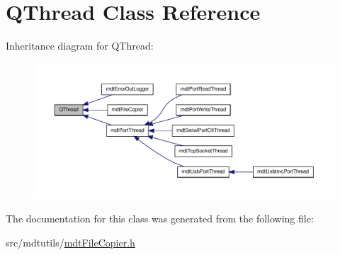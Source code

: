 \hypertarget{class_q_thread}{\section{Q\-Thread Class Reference}
\label{class_q_thread}
}


Inheritance diagram for Q\-Thread\-:
\nopagebreak
\begin{figure}[H]
\begin{center}
\leavevmode
\includegraphics[width=350pt]{class_q_thread__inherit__graph}
\end{center}
\end{figure}


The documentation for this class was generated from the following file\-:\begin{DoxyCompactItemize}
\item 
src/mdtutils/\hyperlink{mdt_file_copier_8h}{mdt\-File\-Copier.\-h}\end{DoxyCompactItemize}

